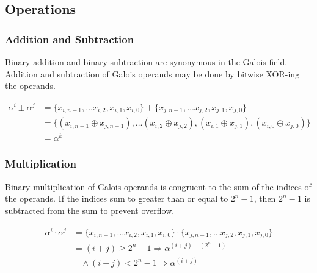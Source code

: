 \documentclass[paper=usletter, fontsize=12pt]{article}
\begin{document}
            \newpage

        \subsection{Operations}

            \subsubsection{Addition and Subtraction}
            Binary addition and binary subtraction are synonymous in the Galois field. Addition and subtraction of Galois operands may be done by bitwise XOR-ing the operands.

                \begin{equation*}
                    \begin{split}
                        \alpha^{i} \pm \alpha^{j} & = \{x_{i, n-1},\ldots x_{i, 2},x_{i, 1},x_{i, 0}\} + \{x_{j, n-1}, \ldots x_{j, 2}, x_{j, 1}, x_{j, 0}\} \\
                        & = \{(x_{i, n-1} \oplus x_{j,n-1}), \ldots (x_{i, 2}\oplus x_{j, 2}), (x_{i, 1}\oplus x_{j, 1}), (x_{i, 0}\oplus x_{j, 0})\} \\
                        & = \alpha^{k}
                    \end{split}
                \end{equation*}

            \subsubsection{Multiplication}
            Binary multiplication of Galois operands is congruent to the sum of the indices of the operands. If the indices sum to greater than or equal to $2^{n}-1$, then $2^{n}-1$ is subtracted from the sum to prevent overflow.

                \begin{equation*}
                    \begin{split}
                        \alpha^{i} \cdot \alpha^{j} & = \{x_{i, n-1},\ldots x_{i, 2},x_{i, 1},x_{i, 0}\} \cdot \{x_{j, n-1}, \ldots x_{j, 2}, x_{j, 1}, x_{j, 0}\} \\
                        & = (i + j) \geq 2^{n}-1 \Longrightarrow \alpha^{(i + j) - (2^{n}-1)} \\
                        & \ \ \ \ \wedge (i + j) < 2^{n}-1 \Longrightarrow \alpha^{(i + j)}
                    \end{split}
                \end{equation*}
\end{document}
